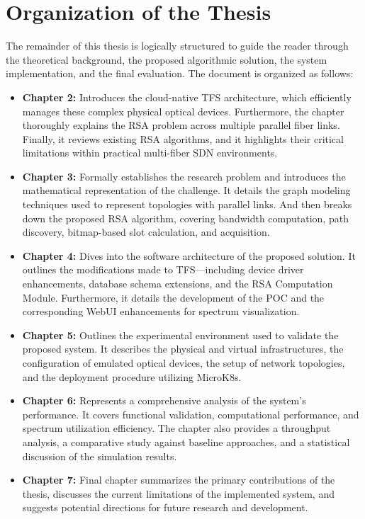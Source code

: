 \documentclass[12pt, a4paper, twoside, openright]{report}
\begin{document}
\section{Organization of the Thesis}
The remainder of this thesis is logically structured to guide the reader through the theoretical background, the proposed algorithmic solution, the system implementation, and the final evaluation. The document is organized as follows:
\begin{itemize}
    \item \textbf{Chapter 2:} Introduces the cloud-native TFS architecture, which efficiently manages these complex physical optical devices. Furthermore, the chapter thoroughly explains the RSA problem across multiple parallel fiber links. Finally, it reviews existing RSA algorithms, and it highlights their critical limitations within practical multi-fiber SDN environments.
    \item \textbf{Chapter 3:} Formally establishes the research problem and introduces the mathematical representation of the challenge. It details the graph modeling techniques used to represent topologies with parallel links. And then breaks down the proposed RSA algorithm, covering bandwidth computation, path discovery, bitmap-based slot calculation, and acquisition.
    \item \textbf{Chapter 4:} Dives into the software architecture of the proposed solution. It outlines the modifications made to TFS—including device driver enhancements, database schema extensions, and the RSA Computation Module. Furthermore, it details the development of the POC and the corresponding WebUI enhancements for spectrum visualization.
    \item \textbf{Chapter 5:} Outlines the experimental environment used to validate the proposed system. It describes the physical and virtual infrastructures, the configuration of emulated optical devices, the setup of network topologies, and the deployment procedure utilizing MicroK8s.
    \item \textbf{Chapter 6:} Represents a comprehensive analysis of the system's performance. It covers functional validation, computational performance, and spectrum utilization efficiency. The chapter also provides a throughput analysis, a comparative study against baseline approaches, and a statistical discussion of the simulation results.
    \item \textbf{Chapter 7:} Final chapter summarizes the primary contributions of the thesis, discusses the current limitations of the implemented system, and suggests potential directions for future research and development.
\end{itemize}
\end{document}
